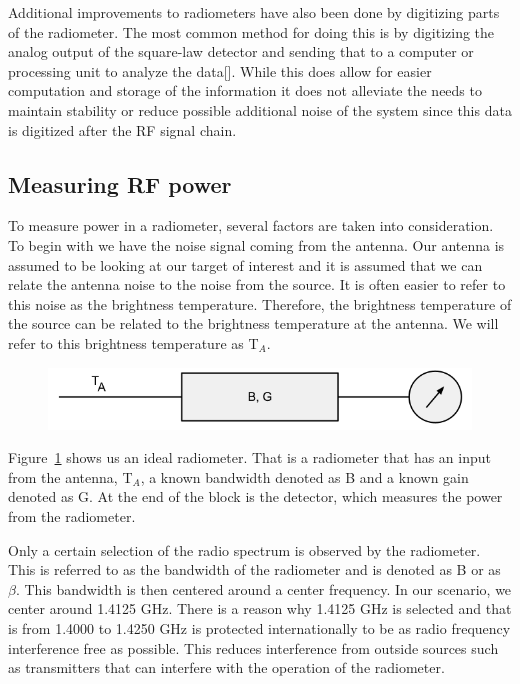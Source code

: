 Additional improvements to radiometers have also been done by digitizing parts of the radiometer.  The most common method for doing this is by digitizing the analog output of the square-law detector and sending that to a computer or processing unit to analyze the data[\cite{Bremer}].  While this does allow for easier computation and storage of the information it does not alleviate the needs to maintain stability or reduce possible additional noise of the system since this data is digitized after the RF signal chain.

\subsection{Measuring RF power}

To measure power in a radiometer, several factors are taken into consideration.  To begin with we have the noise signal coming from the antenna.  Our antenna is assumed to be looking at our target of interest and it is assumed that we can relate the antenna noise to the noise from the source.  It is often easier to refer to this noise as the brightness temperature.  Therefore, the brightness temperature of the source can be related to the brightness temperature at the antenna.  We will refer to this brightness temperature as T$_{A}$.  

{\begin{figure}[h!tb] 
\centering
\includegraphics[width=\textwidth]{Images/simple_rad.png}
\label{simplerad}
\end{figure}
}

Figure~\ref{simplerad} shows us an ideal radiometer.  That is a radiometer that has an input from the antenna, T$_{A}$, a known bandwidth denoted as B and a known gain denoted as G.  At the end of the block is the detector, which measures the power from the radiometer.

Only a certain selection of the radio spectrum is observed by the radiometer.  This is referred to as the bandwidth of the radiometer and is denoted as B or as $\beta$.  This bandwidth is then centered around a center frequency.  In our scenario, we center around 1.4125 GHz.  There is a reason why 1.4125 GHz is selected and that is from 1.4000 to 1.4250 GHz is protected internationally to be as radio frequency interference free as possible.  This reduces interference from outside sources such as transmitters that can interfere with the operation of the radiometer.  

